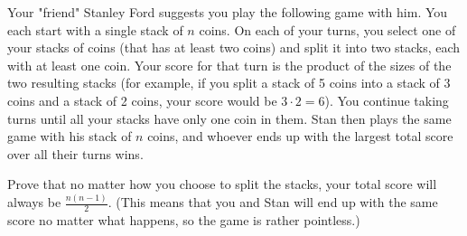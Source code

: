 \documentclass[11pt]{article}
\begin{document}
\begin{Parts}
\begin{solution}

    \end{solution}
\end{Parts}
\pagebreak
{}

Your "friend" Stanley Ford suggests you play the following game with him.  You each start with a single stack of $n$ coins.  On each of your turns, you select one of your stacks of coins (that has at least two coins) and split it into two stacks, each with at least one coin.  Your score for that turn is the product of the sizes of the two resulting stacks (for example, if you split a stack of 5 coins into a stack of 3 coins and a stack of 2 coins, your score would be $3 \cdot 2 = 6$).  You continue taking turns until all your stacks have only one coin in them.  Stan then plays the same game with his stack of $n$ coins, and whoever ends up with the largest total score over all their turns wins.

Prove that no matter how you choose to split the stacks, your total score will always be $\frac{n(n - 1)}{2}$. (This means that you and Stan will end up with the same score no matter what happens, so the game is rather pointless.)
\end{document}
